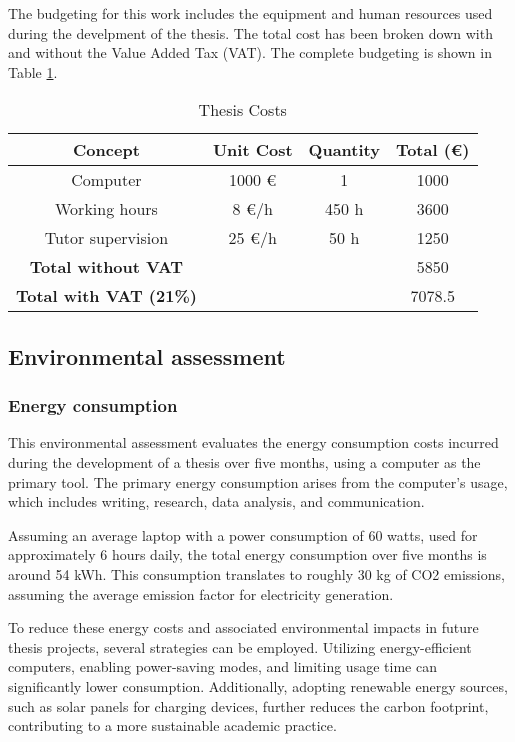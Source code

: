 \documentclass[a4paper,11pt, titlepage, twoside]{article}
\begin{document}
The budgeting for this work includes the equipment and human resources used during the develpment of the thesis.
The total cost has been broken down with and without the Value Added Tax (VAT). The complete budgeting is shown in Table 
\ref{tab:costs}.
\begin{table}[h]
\centering
\begin{tabular}{c c c c}
\hline
\textbf{Concept} & \textbf{ Unit Cost} & \textbf{Quantity} & \textbf{ Total (\euro)} \\
\hline
Computer & 1000 \euro & 1 & 1000\\
Working hours & 8 \euro/h  & 450 h & 3600 \\
Tutor supervision & 25 \euro/h   &  50 h & 1250 \\
\hline
\textbf{Total without VAT} & & & 5850 \\
\hline
\textbf{Total with VAT (21\%)} & & &  7078.5 \\
\hline
\end{tabular}
\caption{Thesis Costs}
\label{tab:costs}
\end{table}

\subsection{Environmental assessment}

\subsubsection{Energy consumption}

This environmental assessment evaluates the energy consumption costs incurred during
the development of a thesis over five months, using a computer as the primary tool. The primary energy consumption arises
from the computer's usage, which includes writing, research, data analysis, and communication.\par

Assuming an average laptop with a power consumption of 60 watts, used for approximately 6 hours daily, the total energy consumption
over five months is around 54 kWh. This consumption translates to roughly 30 kg of CO2 emissions, assuming the average emission
factor for electricity generation.\par

To reduce these energy costs and associated environmental impacts in future thesis projects, several strategies can be employed.
Utilizing energy-efficient computers, enabling power-saving modes, and limiting usage time can significantly lower consumption.
Additionally, adopting renewable energy sources, such as solar panels for charging devices, further reduces the carbon footprint,
contributing to a more sustainable academic practice.
\end{document}
